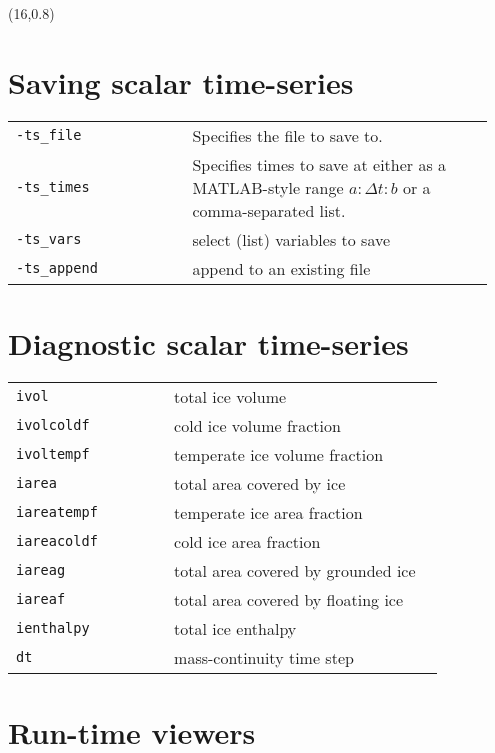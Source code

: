 \documentclass[landscape]{article}
\begin{document}
\begin{textblock}{15}(16,0.8)

\section{Saving scalar time-series}
\begin{tabular}{@{}p{0.35\linewidth}p{0.6\linewidth}@{}}
  \texttt{-ts_file} & Specifies the file to save to.\\
  \texttt{-ts_times} & Specifies times to save at either as a MATLAB-style range $a:\Delta t:b$ or a comma-separated list. \\
  \texttt{-ts_vars} & select (list) variables to save\\
  \texttt{-ts_append} & append to an existing file\\
\end{tabular}

\section{Diagnostic scalar time-series}
\label{sec:scalar-time-series}

\begin{tabular}{@{}p{0.35\linewidth}p{0.6\linewidth}@{}}
\texttt{ivol} & total ice volume\\
\texttt{ivolcoldf} & cold ice volume fraction\\
\texttt{ivoltempf} & temperate ice volume fraction\\
\texttt{iarea} & total area covered by ice\\
\texttt{iareatempf} & temperate ice area fraction\\
\texttt{iareacoldf} & cold ice area fraction\\
\texttt{iareag} & total area covered by grounded ice\\
\texttt{iareaf} & total area covered by floating ice\\
\texttt{ienthalpy} & total ice enthalpy\\
\texttt{dt} & mass-continuity time step\\
\end{tabular}

\section{Run-time viewers}
\label{sec:run-time-viewers}


\end{textblock}
\end{document}
